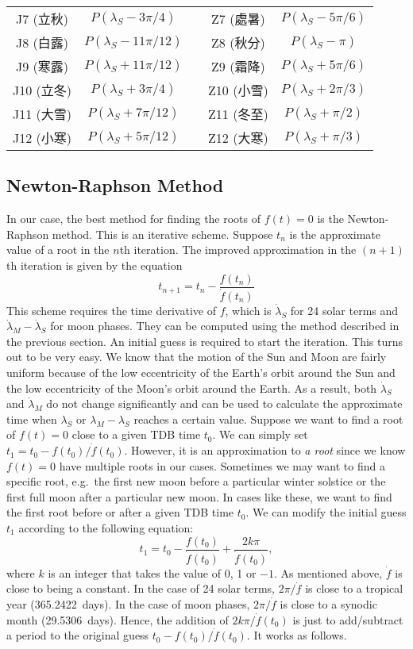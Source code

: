 \documentclass[12pt]{article}
\newcommand \beq {\begin{equation}}
\newcommand \eeq {\end{equation}}
\begin{document}
\begin{CJK}{UTF8}{bkai}
\begin{tabular}{cc|c|cc}
  J7 (立秋) & $P(\lambda_S - 3\pi/4)$ & & Z7 (處暑) & $P(\lambda_S - 5\pi/6)$ \\
  J8 (白露) & $P(\lambda_S - 11\pi/12)$ & & Z8 (秋分) & $P(\lambda_S - \pi)$ \\ 
  J9 (寒露) & $P(\lambda_S + 11\pi/12)$ & & Z9 (霜降) & $P(\lambda_S + 5\pi/6)$ \\
  J10 (立冬) & $P(\lambda_S + 3\pi/4)$ & & Z10 (小雪) & $P(\lambda_S + 2\pi/3)$ \\
  J11 (大雪) & $P(\lambda_S + 7\pi/12)$ & & Z11 (冬至) & $P(\lambda_S + \pi/2)$ \\ 
  J12 (小寒) & $P(\lambda_S + 5\pi/12)$ & & Z12 (大寒) & $P(\lambda_S + \pi/3)$ \\
\hline
\end{tabular}

\subsection{Newton-Raphson Method}

In our case, the best method for finding the roots of $f(t)=0$ is the Newton-Raphson 
method. This is an iterative scheme. Suppose $t_n$ is the approximate value of 
a root in the $n$th iteration. The improved approximation in the $(n+1)$th iteration 
is given by the equation 
\beq
  t_{n+1} = t_n - \frac{f(t_n)}{\dot{f}(t_n)} 
\eeq
This scheme requires the time derivative of $f$, which is $\dot{\lambda}_S$ for 
24 solar terms and $\dot{\lambda}_M - \dot{\lambda}_S$ for moon phases. They can be 
computed using the method described in the previous section. An initial guess is 
required to start the iteration. 
This turns out to be very easy. We know that the motion of the Sun and 
Moon are fairly uniform because of the low eccentricity of the Earth's orbit around 
the Sun and the low eccentricity of the Moon's orbit around the Earth. As a result, 
both $\dot{\lambda}_S$ and $\dot{\lambda}_M$ do not change significantly and can be 
used to calculate the approximate time when $\lambda_S$ or $\lambda_M-\lambda_S$ 
reaches a certain value. Suppose we want to find a root of $f(t)=0$ close to 
a given TDB time $t_0$. We can simply set $t_1 = t_0 - f(t_0)/\dot{f}(t_0)$. 
However, it is an approximation to 
{\em a root} since we know $f(t)=0$ have multiple roots in our cases. Sometimes 
we may want to find a specific root, e.g.\ the first new moon before a particular 
winter solstice or the first full moon after a particular new moon. In cases like 
these, we want to find the first root before or after a given TDB time $t_0$. We can 
modify the initial guess $t_1$ according to the following equation:
\beq
  t_1 = t_0 - \frac{f(t_0)}{\dot{f}(t_0)} + \frac{2k\pi}{\dot{f}(t_0)} ,
\eeq
where $k$ is an integer that takes the value of 0, 1 or $-1$. As mentioned above, 
$\dot{f}$ is close to being a constant. In the case of 24 solar terms, 
$2\pi/\dot{f}$ is close to a tropical year (365.2422~days). In the case of 
moon phases, $2\pi/\dot{f}$ is close to a synodic month (29.5306~days). 
Hence, the addition of $2k\pi/\dot{f}(t_0)$ is just to add/subtract 
a period to the original guess $t_0 - f(t_0)/\dot{f}(t_0)$. It works 
as follows. 


\end{CJK}
\end{document}
